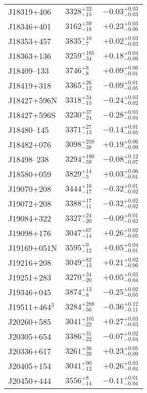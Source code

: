 \documentclass{aa}
\begin{document}
\begin{appendix}
\begin{center}
\begin{xtabular}{lll}
J18319+406 & $3328_{-15}^{+32}$ & $-0.03_{-0.03}^{+0.03}$ \\
J18346+401 & $3162_{-18}^{+59}$ & $+0.23_{-0.06}^{+0.03}$ \\
J18353+457 & $3835_{-7}^{+10}$ & $+0.02_{-0.03}^{+0.03}$ \\
J18363+136 & $3259_{-34}^{+105}$ & $+0.18_{-0.09}^{+0.04}$ \\
J18409--133 & $3746_{-8}^{+8}$ & $+0.09_{-0.01}^{+0.06}$ \\
J18419+318 & $3365_{-12}^{+26}$ & $-0.09_{-0.05}^{+0.01}$ \\
J18427+596N & $3318_{-15}^{+34}$ & $-0.24_{-0.02}^{+0.03}$ \\
J18427+596S & $3230_{-24}^{+37}$ & $-0.28_{-0.04}^{+0.03}$ \\
J18480--145 & $3371_{-13}^{+27}$ & $-0.14_{-0.05}^{+0.01}$ \\
J18482+076 & $3098_{-38}^{+258}$ & $+0.19_{-0.09}^{+0.06}$ \\
J18498--238 & $3294_{-59}^{+180}$ & $-0.08_{-0.07}^{+0.12}$ \\
J18580+059 & $3829_{-5}^{+14}$ & $+0.03_{-0.01}^{+0.06}$ \\
J19070+208 & $3444_{-17}^{+16}$ & $-0.32_{-0.02}^{+0.01}$ \\
J19072+208 & $3388_{-11}^{+17}$ & $-0.32_{-0.02}^{+0.02}$ \\
J19084+322 & $3327_{-20}^{+24}$ & $-0.09_{-0.03}^{+0.01}$ \\
J19098+176 & $3047_{-14}^{+67}$ & $+0.26_{-0.05}^{+0.02}$ \\
J19169+051N & $3595_{-12}^{+9}$ & $+0.05_{-0.01}^{+0.04}$ \\
J19216+208 & $3049_{-13}^{+82}$ & $+0.21_{-0.06}^{+0.02}$ \\
J19251+283 & $3270_{-20}^{+34}$ & $+0.05_{-0.04}^{+0.03}$ \\
J19346+045 & $3874_{-8}^{+13}$ & $-0.25_{-0.05}^{+0.02}$ \\
J19511+464$^{3}$ & $3284_{-56}^{+288}$ & $-0.36_{-0.11}^{+0.12}$ \\
J20260+585 & $3041_{-22}^{+101}$ & $+0.27_{-0.03}^{+0.03}$ \\
J20305+654 & $3386_{-22}^{+31}$ & $-0.07_{-0.04}^{+0.02}$ \\
J20336+617 & $3261_{-39}^{+36}$ & $+0.23_{-0.09}^{+0.05}$ \\
J20405+154 & $3041_{-12}^{+90}$ & $+0.26_{-0.04}^{+0.03}$ \\
J20450+444 & $3556_{-14}^{+8}$ & $-0.11_{-0.04}^{+0.01}$ \\

\end{xtabular}
\end{center}
\end{appendix}
\end{document}
